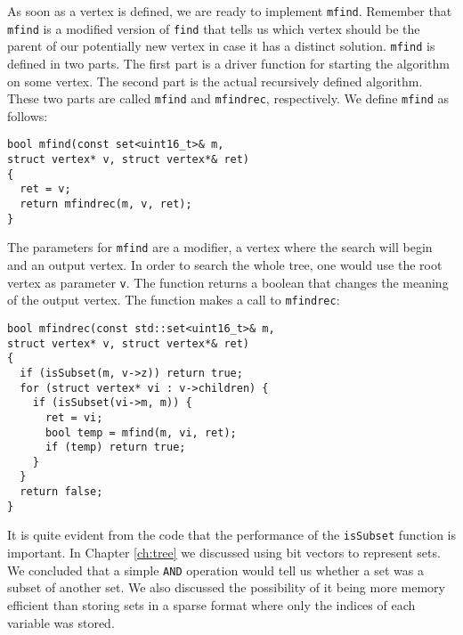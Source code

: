 As soon as a vertex is defined, we are ready to implement \texttt{mfind}.
Remember that \texttt{mfind} is a modified version of \texttt{find} that tells
us which vertex should be the parent of our potentially new vertex in case it
has a distinct solution.
\texttt{mfind} is defined in two parts. The first part is a driver function
for starting the algorithm on some vertex. The second part is the actual
recursively defined algorithm. These two parts are called \texttt{mfind} and
\texttt{mfindrec}, respectively. We define \texttt{mfind} as follows:
\begin{verbatim}
bool mfind(const set<uint16_t>& m,
struct vertex* v, struct vertex*& ret)
{
  ret = v;
  return mfindrec(m, v, ret);
}
\end{verbatim}
The parameters for \texttt{mfind} are a modifier, a vertex where the search
will begin and an output vertex.
In order to search the whole tree, one would use the root vertex as parameter
\texttt{v}.
The function returns a boolean that changes the meaning of the output vertex.
The function makes a call to \texttt{mfindrec}:
\begin{verbatim}
bool mfindrec(const std::set<uint16_t>& m,
struct vertex* v, struct vertex*& ret)
{
  if (isSubset(m, v->z)) return true;
  for (struct vertex* vi : v->children) {
    if (isSubset(vi->m, m)) {
      ret = vi; 
      bool temp = mfind(m, vi, ret);
      if (temp) return true;
    }   
  }   
  return false;
}
\end{verbatim}
It is quite evident from the code that the performance of the \texttt{isSubset}
function is important. In Chapter \ref{ch:tree} we discussed using bit vectors 
to represent sets. We concluded that a simple \texttt{AND} operation would tell
us whether a set was a subset of another set.
We also discussed the possibility of it being more memory efficient than
storing sets in a sparse format where only the indices of each variable was
stored.

